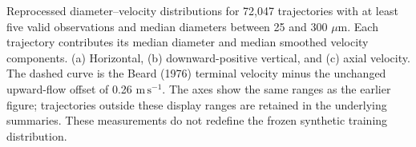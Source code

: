 Reprocessed diameter--velocity distributions for 72,047 trajectories with at least five valid observations and median diameters between 25 and 300 \(\mu\mathrm{m}\). Each trajectory contributes its median diameter and median smoothed velocity components. (a) Horizontal, (b) downward-positive vertical, and (c) axial velocity. The dashed curve is the Beard (1976) terminal velocity minus the unchanged upward-flow offset of 0.26 \(\mathrm{m\,s^{-1}}\). The axes show the same ranges as the earlier figure; trajectories outside these display ranges are retained in the underlying summaries. These measurements do not redefine the frozen synthetic training distribution.
